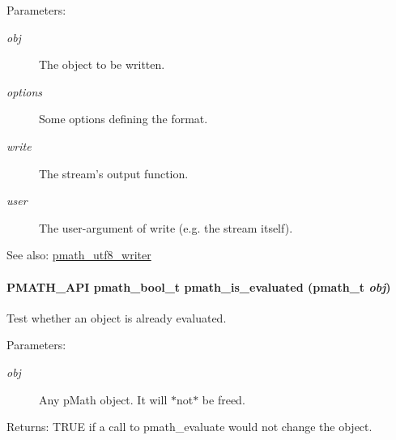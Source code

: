 \begin{Desc}
\item[Parameters:]
\begin{description}
\item[{\em obj}]The object to be written. \item[{\em options}]Some options defining the format. \item[{\em write}]The stream's output function. \item[{\em user}]The user-argument of write (e.g. the stream itself).\end{description}
\end{Desc}
\begin{Desc}
\item[See also:]\hyperlink{group__strings_g5e7a9b1a5eb8861e94dc1bea92c77424}{pmath\_\-utf8\_\-writer} \end{Desc}
\hypertarget{group__objects_gb26224de5170fa688fa67dd2e85834e3}{
\paragraph[{pmath\_\-is\_\-evaluated}]{\setlength{\rightskip}{0pt plus 5cm}PMATH\_\-API {\bf pmath\_\-bool\_\-t} pmath\_\-is\_\-evaluated ({\bf pmath\_\-t} {\em obj})}\hfill}
\label{group__objects_gb26224de5170fa688fa67dd2e85834e3}


Test whether an object is already evaluated. 

\begin{Desc}
\item[Parameters:]
\begin{description}
\item[{\em obj}]Any pMath object. It will $\ast$not$\ast$ be freed. \end{description}
\end{Desc}
\begin{Desc}
\item[Returns:]TRUE if a call to pmath\_\-evaluate would not change the object. \end{Desc}
